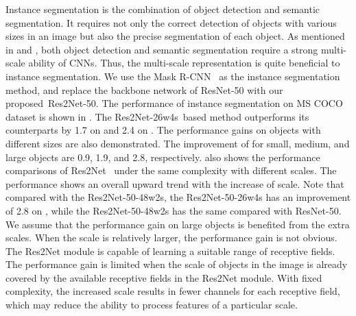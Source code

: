 \documentclass[10pt,journal,cspaper,compsoc]{IEEEtran}
\newcommand{\ourM}{{Res2Net}}
\begin{document}
Instance segmentation is the combination of object detection 
and semantic segmentation.
It requires not only the correct detection of objects with various sizes in an image
but also the precise segmentation of each object.
As mentioned in  and ,
both object detection and semantic segmentation require a strong 
multi-scale ability of CNNs.
Thus, the multi-scale representation is quite beneficial to instance segmentation.
We use the Mask R-CNN~\cite{he2017mask} as the instance segmentation method, 
and replace the backbone network of ResNet-50 with our proposed~\ourM-50.
The performance of instance segmentation on MS COCO \cite{lin2014microsoft} dataset 
is shown in .
The \ourM-26w4s~based method outperforms its counterparts 
by 1.7 on  and 2.4 on .
The performance gains on objects with different sizes are also demonstrated.
The improvement of  for small, medium, and large objects are 
0.9, 1.9, and 2.8, respectively.
 also shows the performance comparisons of \ourM~ 
under the same complexity with different scales.
The performance shows an overall upward trend  with the increase of scale.
Note that compared with the Res2Net-50-48w2s, the Res2Net-50-26w4s
has an improvement of 2.8  on , while the Res2Net-50-48w2s 
has the same  compared with ResNet-50.
We assume that the performance gain on large objects is benefited from the extra scales.
When the scale is relatively larger, the performance gain is not obvious.
The Res2Net module is capable of learning a suitable range of receptive fields.
The performance gain is limited when the scale of objects in the image
is already covered by the available receptive fields in the Res2Net module.
With fixed complexity, the increased scale results in fewer channels for each receptive field, 
which may reduce the ability to process features of a particular scale.
\end{document}
